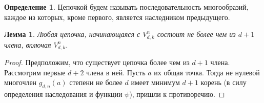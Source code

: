 \documentclass[16pt]{article}
\theoremstyle{plain}
\newtheorem{lemma}[theorem]{Лемма}
\theoremstyle{definition}
\newtheorem{definition}[theorem]{Определение}
\theoremstyle{remark}
\begin{document}
\begin{definition}
Цепочкой будем называть последовательность многообразий, каждое  из которых, кроме первого, является наследником предыдущего.
\end{definition}

\begin{lemma}\label{lemma:o_konechnosti_cepochek}
Любая цепочка, начинающаяся с ${V}_{d,k}^{n}$ состоит не более чем из  $d+1$ члена, включая ${V}_{d,k}^{n}$.
\end{lemma}

\begin{proof}
Предположим, что  существует цепочка более чем из $d+1$ члена. Рассмотрим первые $d+2$  члена в ней. Пусть $a$ их общая точка. Тогда не нулевой многочлен $g_{d,n}(a)$ степени не более $d$ имеет минимум $d+1$  корень (в силу определения наследования и функции $\psi$), пришли к противоречию.
\end{proof}
\end{document}
